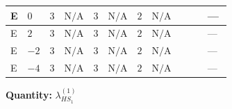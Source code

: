 \documentclass[8pt]{article}
\begin{document}
\begin{landscape}
\begin{longtable}{@{}llcccccc >{\raggedright\arraybackslash}p{0.21\linewidth} >{\raggedright\arraybackslash}p{0.21\linewidth} >{\raggedright\arraybackslash}p{0.21\linewidth}@{}}
\midrule
E & $0$ & $3$ & $\text{N/A}$ & $3$ & $\text{N/A}$ & $2$ & $\text{N/A}$ & \scriptsize\adjustbox{max width=\linewidth}{$\begin{gathered} +4 {\lambda_{HS_1}^{(1)}}^2\end{gathered}$} & \scriptsize\adjustbox{max width=\linewidth}{$\begin{gathered} +8 {\lambda_{HS_1}^{(1)}} {\lambda_{S_1}^{(1)}}\end{gathered}$} & --- \\
\midrule
E & $2$ & $3$ & $\text{N/A}$ & $3$ & $\text{N/A}$ & $2$ & $\text{N/A}$ & \scriptsize\adjustbox{max width=\linewidth}{$\begin{gathered} +4 {\lambda_{HS_1}^{(1)}}^2\end{gathered}$} & \scriptsize\adjustbox{max width=\linewidth}{$\begin{gathered} +8 {\lambda_{HS_1}^{(1)}} {\lambda_{S_1}^{(1)}}\end{gathered}$} & --- \\
\midrule
E & $-2$ & $3$ & $\text{N/A}$ & $3$ & $\text{N/A}$ & $2$ & $\text{N/A}$ & \scriptsize\adjustbox{max width=\linewidth}{$\begin{gathered} +4 {\lambda_{HS_1}^{(1)}}^2\end{gathered}$} & \scriptsize\adjustbox{max width=\linewidth}{$\begin{gathered} +8 {\lambda_{HS_1}^{(1)}} {\lambda_{S_1}^{(1)}}\end{gathered}$} & --- \\
\midrule
E & $-4$ & $3$ & $\text{N/A}$ & $3$ & $\text{N/A}$ & $2$ & $\text{N/A}$ & \scriptsize\adjustbox{max width=\linewidth}{$\begin{gathered} +4 {\lambda_{HS_1}^{(1)}}^2\end{gathered}$} & \scriptsize\adjustbox{max width=\linewidth}{$\begin{gathered} +8 {\lambda_{HS_1}^{(1)}} {\lambda_{S_1}^{(1)}}\end{gathered}$} & --- \\
\midrule
\bottomrule
\end{longtable}
\clearpage
\noindent\textbf{Quantity: }$\lambda_{HS_1}^{(1)}$\par\smallskip

\end{landscape}
\end{document}
